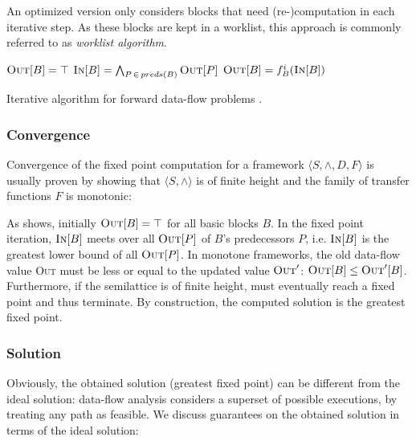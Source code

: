 An optimized version only considers blocks that need (re-)computation in each iterative step. As these blocks are kept in a worklist, this approach is commonly referred to as \emph{worklist algorithm}.

\begin{algorithm}[h]
    \begin{algorithmic}
            \STATE $\textsc{Out}[B] = \top$
        \ENDFOR
                \STATE $\textsc{In}[B] = \bigwedge_{P \,\in\, preds(B)} \textsc{Out}[P]$
                \STATE $\textsc{Out}[B] = f^i_B(\textsc{In}[B])$
            \ENDFOR
        \ENDWHILE
    \end{algorithmic}
    \caption{Iterative algorithm for forward data-flow problems \cite{DBLP:books/aw/AhoSU86}.}
    \label{alg:itdataflow}
\end{algorithm}

\subsubsection{Convergence}

Convergence of the fixed point computation for a framework $\langle S, \wedge, D, F \rangle$ is usually proven by showing that $\langle S, \wedge \rangle$ is of finite height and the family of transfer functions $F$ is monotonic:

As  shows, initially $\textsc{Out}[B] = \top$ for all basic blocks $B$. In the fixed point iteration, $\textsc{In}[B]$ meets over all $\textsc{Out}[P]$ of $B$'s predecessors $P$, i.e. $\textsc{In}[B]$ is the greatest lower bound of all $\textsc{Out}[P]$. In monotone frameworks, the old data-flow value \textsc{Out} must be less or equal to the updated value $\textsc{Out}'$: $\textsc{Out}[B] \le \textsc{Out}'[B]$. Furthermore, if the semilattice is of finite height,  must eventually reach a fixed point and thus terminate. By construction, the computed solution is the greatest fixed point.

\subsubsection{Solution}

Obviously, the obtained solution (greatest fixed point) can be different from the ideal solution: data-flow analysis considers a superset of possible executions, by treating any path as feasible. We discuss guarantees on the obtained solution in terms of the ideal solution:


